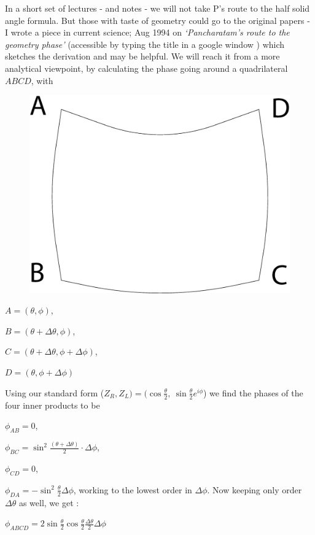 In a short set of lectures - and notes - we will not take P’s route to the half
solid angle formula. But those with taste of geometry could go to the original
papers - I wrote a piece in current science; Aug 1994 on \textit{`Pancharatam's route
to the geometry phase'} (accessible by typing the title in a google window )
which sketches the derivation and may be helpful. We will reach it from a
more analytical viewpoint, by calculating the phase going around a quadrilateral
$ABCD$, with
\begin{figure}[H]
\centering
\includegraphics[scale=0.1]{src/images/chap26/12.eps}
\end{figure}

$A = (\theta, \phi)$,

$B = (\theta + \Delta \theta, \phi)$,

$C = (\theta + \Delta \theta, \phi + \Delta \phi)$,

$D = (\theta, \phi + \Delta \phi)$

Using our standard form ($Z_R , Z_L ) = (\cos \frac{\theta}{2}, ~ \sin \frac{\theta}{2} e^{i\phi}$) we find the phases
of the four inner products to be

$\phi_{AB} = 0$,

$\phi_{BC} = \sin^2 \frac{(\theta + \Delta \theta)}{2} \cdot \Delta \phi$,

$\phi_{CD} = 0$,

$\phi_{DA} = -\sin^2 \frac{\theta}{2} \Delta \phi$, working to the lowest order in $\Delta \phi$. 
Now keeping only order $\Delta \theta$ as well, we get :

$\phi_{ABCD} = 2 \sin \frac{\theta}{2} \cos \frac{\theta}{2} \frac{\Delta \theta }{2} \Delta \phi$

